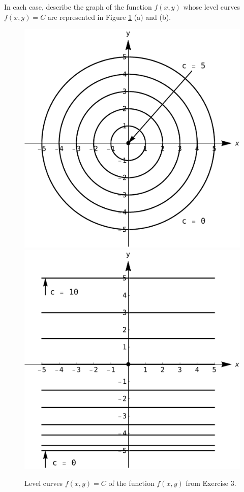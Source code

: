 \ifanalysis
\begin{Exercise}[difficulty = 3, label=oef_niveaukrommes] In each case, describe the graph of the function $f(x,y)$ whose level curves $f(x,y)=C$ are represented in Figure \ref{fig_mult_var_31} (a) and (b). 
\begin{figure}[H]
\includegraphics[scale=0.4]{fig_mult_var_31a} \hspace{1.5cm}
\includegraphics[scale=0.4]{fig_mult_var_31b}
\caption{Level curves $f(x,y) = C$ of the function $f(x,y)$ from Exercise 3. }
\label{fig_mult_var_31}
\end{figure}

\end{Exercise}

